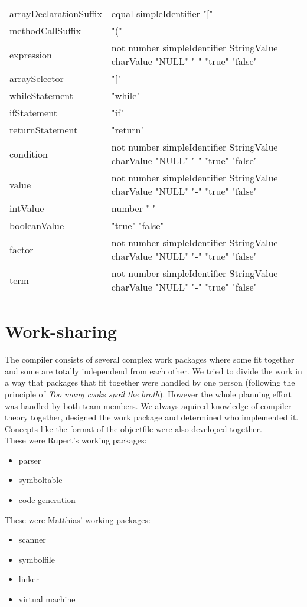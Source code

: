 \begin{tabularx}{\linewidth}{YY}
arrayDeclarationSuffix & equal simpleIdentifier "[" \\
methodCallSuffix & "(" \\
expression & not number simpleIdentifier StringValue charValue "NULL" "-" "true" "false" \\
arraySelector & "[" \\
whileStatement & "while" \\
ifStatement & "if" \\
returnStatement & "return" \\
condition & not number simpleIdentifier StringValue charValue "NULL" "-" "true" "false" \\
value & not number simpleIdentifier StringValue charValue "NULL" "-" "true" "false" \\
intValue & number "-" \\
booleanValue & "true" "false" \\
factor & not number simpleIdentifier StringValue charValue "NULL" "-" "true" "false" \\
term & not number simpleIdentifier StringValue charValue "NULL" "-" "true" "false" \\
\end{tabularx}



\section{Work-sharing}
\label{appendix:work-sharing}
The compiler consists of several complex work packages where some fit together
and some are totally independend from each other. We tried to divide the work in
a way that packages that fit together were handled by one person (following the
principle of \emph{Too many cooks spoil the broth}). 
However the whole planning effort was handled by both team members. We always
aquired knowledge of compiler theory together, designed the work package and
determined who implemented it. Concepts like the format of the objectfile were
also developed together. \\
These were Rupert's working packages:
\begin{itemize}
  \item parser
  \item symboltable
  \item code generation
\end{itemize}
These were Matthias' working packages:
\begin{itemize}
  \item scanner
  \item symbolfile
  \item linker
  \item virtual machine
\end{itemize}


